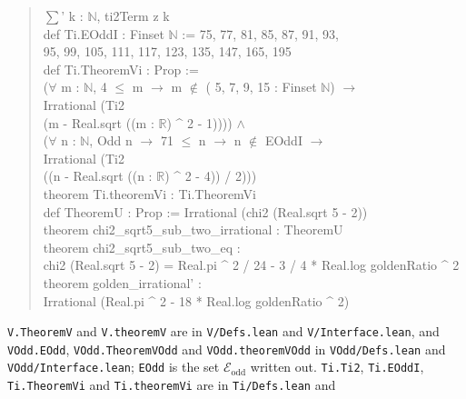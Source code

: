 \documentclass[11pt]{amsart}
\theoremstyle{definition}
\theoremstyle{remark}
\numberwithin{equation}{section}
\newcommand{\cE}{\mathcal{E}}
\newcommand{\lean}[1]{{\def\_{\textunderscore\allowbreak}\texttt{#1}}}
\begin{document}
\begin{quote}
\hspace*{2em}$\sum$' k : $\mathbb{N}$, ti2Term z k\\[2pt]
def Ti.EOddI : Finset $\mathbb{N}$ :=  75, 77, 81, 85, 87, 91, 93,\\
\hspace*{2em}95, 99, 105, 111, 117, 123, 135, 147, 165, 195\\[2pt]
def Ti.TheoremVi : Prop :=\\
\hspace*{2em}($\forall$ m : $\mathbb{N}$, 4 $\le$ m $\to$ m $\notin$ ( 5, 7, 9, 15 : Finset $\mathbb{N}$) $\to$\\
\hspace*{3em}Irrational (Ti2\\
\hspace*{4em}(m - Real.sqrt ((m : $\mathbb{R}$) \^{} 2 - 1)))) $\wedge$\\
\hspace*{2em}($\forall$ n : $\mathbb{N}$, Odd n $\to$ 71 $\le$ n $\to$ n $\notin$ EOddI $\to$\\
\hspace*{3em}Irrational (Ti2\\
\hspace*{4em}((n - Real.sqrt ((n : $\mathbb{R}$) \^{} 2 - 4)) / 2)))\\[2pt]
theorem Ti.theoremVi : Ti.TheoremVi\\[2pt]
def TheoremU : Prop := Irrational (chi2 (Real.sqrt 5 - 2))\\[2pt]
theorem chi2\_sqrt5\_sub\_two\_irrational : TheoremU\\
theorem chi2\_sqrt5\_sub\_two\_eq :\\
\hspace*{2em}chi2 (Real.sqrt 5 - 2) = Real.pi \^{} 2 / 24 - 3 / 4 * Real.log goldenRatio \^{} 2\\
theorem golden\_irrational' :\\
\hspace*{2em}Irrational (Real.pi \^{} 2 - 18 * Real.log goldenRatio \^{} 2)
\end{quote}
\lean{V.TheoremV} and \lean{V.theoremV} are in \lean{V\slash{}Defs.lean} and \lean{V\slash{}Interface.lean}, and
\lean{VOdd.EOdd}, \lean{VOdd.TheoremVOdd} and \lean{VOdd.theoremVOdd} in \lean{VOdd\slash{}Defs.lean} and
\lean{VOdd\slash{}Interface.lean}; \lean{EOdd} is the set $\cE_{\mathrm{odd}}$ written out. \lean{Ti.Ti2},
\lean{Ti.EOddI}, \lean{Ti.TheoremVi} and \lean{Ti.theoremVi} are in \lean{Ti\slash{}Defs.lean} and
\end{document}
